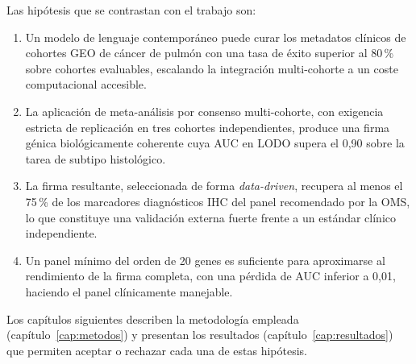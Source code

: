 Las hipótesis que se contrastan con el trabajo son:

\begin{enumerate}
  \item Un modelo de lenguaje contemporáneo puede curar los metadatos
  clínicos de cohortes GEO de cáncer de pulmón con una tasa de éxito
  superior al 80\,\% sobre cohortes evaluables, escalando la integración
  multi-cohorte a un coste computacional accesible.

  \item La aplicación de meta-análisis por consenso multi-cohorte, con
  exigencia estricta de replicación en tres cohortes independientes,
  produce una firma génica biológicamente coherente cuya AUC en LODO
  supera el 0,90 sobre la tarea de subtipo histológico.

  \item La firma resultante, seleccionada de forma \emph{data-driven},
  recupera al menos el 75\,\% de los marcadores diagnósticos IHC del panel
  recomendado por la OMS, lo que constituye una validación externa fuerte
  frente a un estándar clínico independiente.

  \item Un panel mínimo del orden de 20 genes es suficiente para
  aproximarse al rendimiento de la firma completa, con una pérdida de AUC
  inferior a 0,01, haciendo el panel clínicamente manejable.
\end{enumerate}

Los capítulos siguientes describen la metodología empleada
(capítulo~\ref{cap:metodos}) y presentan los resultados
(capítulo~\ref{cap:resultados}) que permiten aceptar o rechazar cada una
de estas hipótesis.
\cleardoublepage
